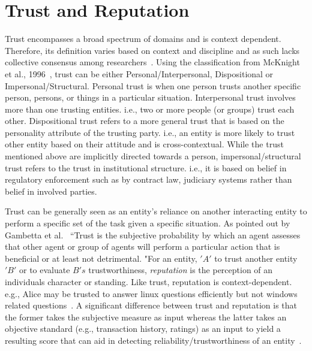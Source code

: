 \section{Trust and Reputation}
Trust encompasses a broad spectrum of domains and is context dependent.
Therefore, its definition varies based on context and discipline and as such
lacks collective consensus among researchers~\cite{mcknight1996meanings}.
Using the classification from McKnight et al., 1996~\cite{mcknight2001trust},
trust can be either Personal/Interpersonal, Dispositional or
Impersonal/Structural. Personal trust is when one person trusts another
specific person, persons, or things in a particular situation. Interpersonal
trust involves more than one trusting entities. i.e., two or more people (or
groups) trust each other. Dispositional trust refers to a more general trust
that is based on the personality attribute of the trusting party. i.e., an
entity is more likely to trust other entity based on their attitude and is
cross-contextual. While the trust mentioned above are implicitly directed
towards a person, impersonal/structural trust refers to the trust in
institutional structure. i.e., it is based on belief in regulatory enforcement
such as by contract law, judiciary systems rather than belief in involved
parties. \par

Trust can be generally seen as an entity's reliance on another interacting
entity to perform a specific set of the task given a specific situation.  As
pointed out by Gambetta et al.~\cite{gambetta2000can} ``Trust is the subjective
probability by which an agent assesses that other agent or group of agents will
perform a particular action that is beneficial or at least not detrimental.
"For an entity, $'A'$ to trust another entity ${'B'}$ or to evaluate $B's$
trustworthiness, \textit{reputation} is the perception of an individuals
character or standing. Like trust, reputation is context-dependent. e.g., Alice
may be trusted to answer linux questions efficiently but not windows related
questions~\cite{zacharia2000collaborative}. A significant difference between
trust and reputation is that the former takes the subjective measure as input
whereas the latter takes an objective standard (e.g., transaction history,
ratings) as an input to yield a resulting score that can aid in detecting
reliability/trustworthiness of an
entity~\cite{Sabater2005,castelfranchi2000trust}.\par 


